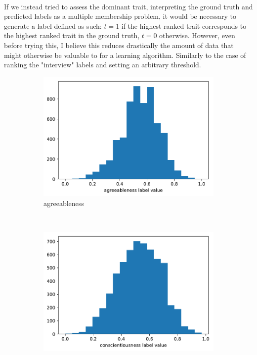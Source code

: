 \documentclass[12pt,a4paper]{report}
\begin{document}
\paragraph{} If we instead tried to assess the dominant trait, interpreting the ground truth and predicted labels as a multiple membership problem, it would be necessary to generate a label defined as such: $t=1$ if the highest ranked trait corresponds to the highest ranked trait in the ground truth, $t=0$ otherwise. However, even before trying this, I believe this reduces drastically the amount of data that might otherwise be valuable to for a learning algorithm. Similarly to the case of ranking the "interview" labels and setting an arbitrary threshold.


\begin{figure}
    \centering
    \begin{subfigure}[b]{0.32\textwidth}
        \includegraphics[width=\textwidth]{imgs/agreeableness_label_value.pdf}
        \caption{agreeableness}
        \label{fig:agreeableness}
    \end{subfigure}
    ~ %
    \begin{subfigure}[b]{0.32\textwidth}
        \includegraphics[width=\textwidth]{imgs/conscientiousness_label_value.pdf}

\end{subfigure}
\end{figure}
\end{document}
